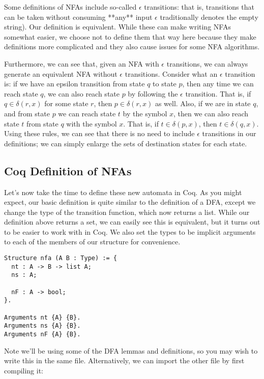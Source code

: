 Some definitions of NFAs include so-called $\epsilon$ transitions: that is, transitions that can be taken without consuming **any** input $\epsilon$ traditionally denotes the empty string).
Our definition is equivalent.
While these can make writing NFAs somewhat easier, we choose not to define them that way here because they make definitions more complicated and they also cause issues for some NFA algorithms.

Furthermore, we can see that, given an NFA with $\epsilon$ transitions, we can always generate an equivalent NFA without $\epsilon$ transitions.
Consider what an $\epsilon$ transition is: if we have an epsilon transition from state $q$ to state $p$, then any time we can reach state $q$, we can also reach state $p$ by following the $\epsilon$ transition.
That is, if $q \in \delta(r, x)$ for some state $r$, then $p \in \delta(r,x)$ as well.
Also, if we are in state $q$, and from state $p$ we can reach state $t$ by the symbol $x$, then we can also reach state $t$ from state $q$ with the symbol $x$.
That is, if $t \in \delta(p, x) $, then $t \in \delta(q, x)$.
Using these rules, we can see that there is no need to include $\epsilon$ transitions in our definitions; we can simply enlarge the sets of destination states for each state.

\subsection{Coq Definition of NFAs}

Let's now take the time to define these new automata in Coq.
As you might expect, our basic definition is quite similar to the definition of a DFA, except we change the type of the transition function, which now returns a list.
While our definition above returns a set, we can easily see this is equivalent, but it turns out to be easier to work with in Coq.
We also set the types to be implicit arguments to each of the members of our structure for convenience.

\begin{verbatim}
Structure nfa (A B : Type) := {
  nt : A -> B -> list A;
  ns : A;

  nF : A -> bool;
}.

Arguments nt {A} {B}.
Arguments ns {A} {B}.
Arguments nF {A} {B}.
\end{verbatim}

Note we'll be using some of the DFA lemmas and definitions, so you may wish to write this in the same file.
Alternatively, we can import the other file by first compiling it:

